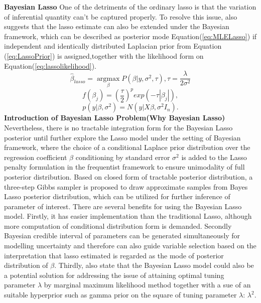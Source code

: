 \textbf{Bayesian Lasso}
One of the detriments of the ordinary lasso is that the variation of inferential quantity can't be captured properly. To resolve this issue, \cite{tibshirani_1996} also suggests that the lasso estimate can also be extended under the Bayesian framework, which can be described as posterior mode Equation(\ref{eq:MLELasso}) if independent and identically distributed Laplacian prior from Equation (\ref{eq:LassoPrior}) is assigned,together with the likelihood form on Equation(\ref{eq:lassolikelihood}). 
\begin{equation}
	\label{eq:MLELasso}
	\hat{\beta}_{lasso} = \underset{\beta}{\operatorname{argmax}}P(\beta|y,\sigma^2,\tau), \tau = \frac{\lambda}{2\sigma^2}
\end{equation}
\begin{equation}
	\label{eq:LassoPrior}
	f(\beta_j) = (\frac{\tau}{2})^p exp(-\tau|\beta_j|),
\end{equation}
\begin{equation}
	\label{eq:lassolikelihood}
	p(y |\beta,\sigma^2) = N(y|X\beta,\sigma^2I_n).
\end{equation}
\textbf{Introduction of Bayesian Lasso Problem(Why Bayesian Lasso)}
Nevertheless, there is no tractable integration form for the Bayesian Lasso posterior until \cite{park_casella_2008} further explore the Lasso model under the setting of Bayesian framework, where the choice of a conditional Laplace prior distribution over the regression coefficient $\beta$ conditioning by standard error $\sigma^2$ is added to the Lasso penalty formulation in the frequentist framework to ensure unimodality of full posterior distribution. Based on closed form of tractable posterior distribution, a three-step Gibbs sampler is proposed to draw approximate samples from Bayes Lasso posterior distribution, which can be utilized for further inference of parameter of interest.
There are several benefits for using the Bayesian Lasso model. Firstly, it has easier implementation than the traditional Lasso, although more computation of conditional distribution form is demanded. Secondly Bayesian credible interval of parameters can be generated simultaneously for modelling uncertainty and therefore can also guide variable selection based on the interpretation that lasso estimated is regarded as the mode of posterior distribution of $\beta$. 
Thirdly, \cite{park_casella_2008} also state that the Bayesian Lasso model could also be a potential solution for addressing the issue of attaining optimal tuning parameter $\lambda$ by marginal maximum likelihood method together with a sue of an suitable hyperprior such as gamma prior on the square of tuning parameter $\lambda$: $\lambda^2$. 
